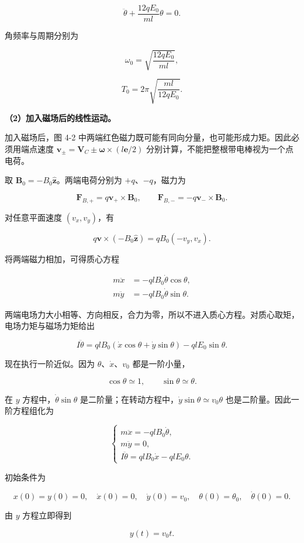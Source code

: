 \documentclass[12pt,a4paper,UTF8]{ctexart}
\begin{document}
\[\ddot\theta+\frac{12qE_0}{ml}\theta=0.\]

角频率与周期分别为

\[\omega_0=\sqrt{\frac{12qE_0}{ml}},\]

\[\boxed{T_0=2\pi\sqrt{\frac{ml}{12qE_0}}}.\]

\textbf{（2）加入磁场后的线性运动。}

加入磁场后，图 4-2
中两端红色磁力既可能有同向分量，也可能形成力矩。因此必须用端点速度
\(\bm v_\pm=\bm V_C\pm\bm\omega\times(l\bm e/2)\)
分别计算，不能把整根带电棒视为一个点电荷。

取 \(\bm B_0=-B_0\hat{\bm z}\)。两端电荷分别为 \(+q\)、\(-q\)，磁力为

\[\bm F_{B,+}=q\bm v_+\times\bm B_0,
\qquad
\bm F_{B,-}=-q\bm v_-\times\bm B_0.\]

对任意平面速度 \((v_x,v_y)\)，有

\[q\bm v\times(-B_0\hat{\bm z})
=qB_0(-v_y,v_x).\]

将两端磁力相加，可得质心方程

\[
\begin{aligned}
m\ddot x&=-qlB_0\dot\theta\cos\theta,\\
m\ddot y&=-qlB_0\dot\theta\sin\theta.
\end{aligned}
\]

两端电场力大小相等、方向相反，合力为零，所以不进入质心方程。对质心取矩，电场力矩与磁场力矩给出

\[I\ddot\theta
=qlB_0(\dot x\cos\theta+\dot y\sin\theta)-qlE_0\sin\theta.\]

现在执行一阶近似。因为 \(\theta\)、\(\dot x\)、\(v_0\) 都是一阶小量，

\[\cos\theta\simeq1,\qquad \sin\theta\simeq\theta.\]

在 \(y\) 方程中，\(\dot\theta\sin\theta\)
是二阶量；在转动方程中，\(\dot y\sin\theta\simeq v_0\theta\)
也是二阶量。因此一阶方程组化为

\[
\begin{cases}
m\ddot x=-qlB_0\dot\theta,\\
m\ddot y=0,\\
I\ddot\theta=qlB_0\dot x-qlE_0\theta.
\end{cases}
\]

初始条件为

\[x(0)=y(0)=0,\quad \dot x(0)=0,\quad \dot y(0)=v_0,\quad
\theta(0)=\theta_0,\quad\dot\theta(0)=0.\]

由 \(y\) 方程立即得到

\[\boxed{y(t)=v_0t}.\]
\end{document}
